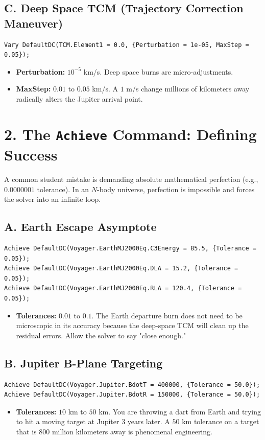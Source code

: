 \documentclass[11pt, letterpaper]{article}
\begin{document}
\subsection*{C. Deep Space TCM (Trajectory Correction Maneuver)}
\begin{lstlisting}
Vary DefaultDC(TCM.Element1 = 0.0, {Perturbation = 1e-05, MaxStep = 0.05});
\end{lstlisting}
\begin{itemize}
    \item \textbf{Perturbation:} $10^{-5}$ km/s. Deep space burns are micro-adjustments.
    \item \textbf{MaxStep:} $0.01$ to $0.05$ km/s. A $1$ m/s change millions of kilometers away radically alters the Jupiter arrival point.
\end{itemize}

\section*{2. The \texttt{Achieve} Command: Defining Success}
A common student mistake is demanding absolute mathematical perfection (e.g., $0.0000001$ tolerance). In an $N$-body universe, perfection is impossible and forces the solver into an infinite loop.

\subsection*{A. Earth Escape Asymptote}
\begin{lstlisting}
Achieve DefaultDC(Voyager.EarthMJ2000Eq.C3Energy = 85.5, {Tolerance = 0.05});
Achieve DefaultDC(Voyager.EarthMJ2000Eq.DLA = 15.2, {Tolerance = 0.05});
Achieve DefaultDC(Voyager.EarthMJ2000Eq.RLA = 120.4, {Tolerance = 0.05});
\end{lstlisting}
\begin{itemize}
    \item \textbf{Tolerances:} $0.01$ to $0.1$. The Earth departure burn does not need to be microscopic in its accuracy because the deep-space TCM will clean up the residual errors. Allow the solver to say "close enough."
\end{itemize}

\subsection*{B. Jupiter B-Plane Targeting}
\begin{lstlisting}
Achieve DefaultDC(Voyager.Jupiter.BdotT = 400000, {Tolerance = 50.0});
Achieve DefaultDC(Voyager.Jupiter.BdotR = 150000, {Tolerance = 50.0});
\end{lstlisting}
\begin{itemize}
    \item \textbf{Tolerances:} $10$ km to $50$ km. You are throwing a dart from Earth and trying to hit a moving target at Jupiter 3 years later. A $50$ km tolerance on a target that is $800$ million kilometers away is phenomenal engineering. 
\end{itemize}
\end{document}
